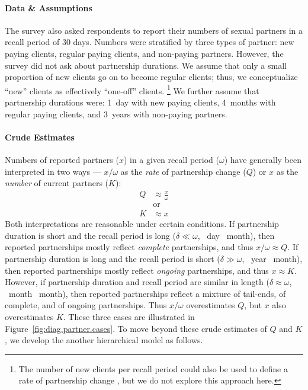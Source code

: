 \paragraph{Data \& Assumptions}
The survey \cite{Baral2014} also asked respondents to report
their numbers of sexual partners in a recall period of 30 days.
Numbers were stratified by three types of partner:
new paying clients, regular paying clients, and non-paying partners.
However, the survey did not ask about partnership durations.
We assume that only a small proportion of new clients go on to become regular clients;
thus, we conceptualize ``new'' clients as effectively ``one-off'' clients.%
\footnote{The number of new clients per recall period
  could also be used to define a rate of partnership change \cite{Fazito2012},
  but we do not explore this approach here.}
We further assume that partnership durations were:
1~day with new paying clients,
4~months with regular paying clients, and
3~years with non-paying partners.
\paragraph{Crude Estimates}
Numbers of reported partners ($x$) in a given recall period ($\omega$)
have generally been interpreted in two ways ---
$x/\omega$ as the \emph{rate} of partnership change ($Q$) or
$x$ as the \emph{number} of current partners ($K$):
\begin{subequations}\label{eq:bQK}
\begin{alignat}{1}
  Q &\approx \frac{x}{\omega} \label{eq:bQ}\\
    &\text{or} \nonumber\\
  K &\approx x \label{eq:bK}
\end{alignat}
\end{subequations}
Both interpretations are reasonable under certain conditions.
If partnership duration is short and the recall period is long
($\delta \ll \omega$, ~day ~month),
then reported partnerships mostly reflect \emph{complete} partnerships,
and thus $x/\omega \approx Q$.
If partnership duration is long and the recall period is short
($\delta \gg \omega$, ~year ~month),
then reported partnerships mostly reflect \emph{ongoing} partnerships,
and thus $x \approx K$.
However, if partnership duration and recall period are similar in length
($\delta \approx \omega$, ~month ~month),
then reported partnerships reflect a mixture of tail-ends, of complete, and of ongoing partnerships.
Thus $x/\omega$ overestimates $Q$, but $x$ also overestimates $K$.
These three cases are illustrated in Figure~\ref{fig:diag.partner.cases}.
To move beyond these crude estimates of $Q$ and $K$,
we develop the another hierarchical model as follows.
